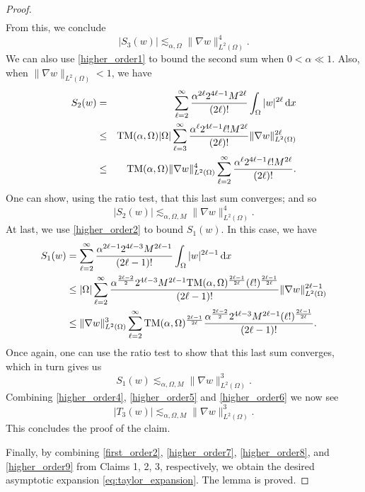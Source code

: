 \documentclass[reqno,11pt]{amsart}
\theoremstyle{definition}
\newcommand{\ud}{\,\mathrm{d}}
\begin{document}
\begin{proof}
\begin{align*}
    \end{align*} 
    From this, we conclude
    \begin{equation} \label{higher_order4}
    |S_3(w)| \lesssim_{\alpha,\Omega} \| \nabla w \|_{L^2(\Omega)}^4.
    \end{equation}
    We can also use \eqref{higher_order1} to bound the second sum when $0<\alpha\ll1$. Also, when $\| \nabla w \|_{L^2(\Omega)} < 1$, we have  
    \begin{eqnarray*} 
    S_2(w) & = & \sum_{\ell = 2}^\infty \frac{\alpha^{2\ell} 2^{4\ell-1}M^{2\ell} }{(2\ell)!} 
    \int_\Omega |w|^{2\ell} \ud x \\  
    & \leq & {\rm TM}(\alpha,\Omega) |\Omega| \sum_{\ell=3}^\infty \frac{\alpha^\ell 2^{4\ell-1} \ell! M^{2\ell}}
    {(2\ell)!} \| \nabla w\|_{L^2(\Omega)}^{2\ell} \\  
    & \leq & {\rm TM}(\alpha,\Omega) \| \nabla w\|_{L^2(\Omega)}^4 \sum_{\ell=2}^\infty 
    \frac{\alpha^\ell 2^{4\ell-1} \ell! M^{2\ell}}{(2\ell)!}. 
    \end{eqnarray*} 
    One can show, using the ratio test, that this last sum converges; and so
    \begin{equation} \label{higher_order5} 
    |S_2(w)| \lesssim_{\alpha,\Omega,M} \| \nabla w \|_{L^2(\Omega)}^4.
    \end{equation}
    At last, we use \eqref{higher_order2} to bound $S_1(w)$. 
    In this case, we have 
    \begin{align*} 
    S_1(w) & = \sum_{\ell=2}^\infty \frac{\alpha^{2\ell-1} 2^{4\ell-3} M^{2\ell-1} }
    {(2\ell-1) !} \int_\Omega |w|^{2\ell-1} \ud x \\ 
    & \leq |\Omega| \sum_{\ell=2}^\infty \frac{\alpha^{\frac{2\ell-2}{2}} 2^{4\ell-3} 
    M^{2\ell-1} {\rm TM}(\alpha,\Omega)^{\frac{2\ell-1}{2\ell}} (\ell!)^{\frac{2\ell-1}{2\ell}}}
    {(2\ell-1)!} \| \nabla w\|_{L^2(\Omega)}^{2\ell-1} \\ 
    & \leq  \| \nabla w \|_{L^2(\Omega)}^3 \sum_{\ell=2}^\infty 
    {\rm TM}(\alpha,\Omega)^{\frac{2\ell-1}{2\ell}}\frac{\alpha^{\frac{2\ell-2}{2}} 2^{4\ell-3} M^{2\ell-1} (\ell!)^{\frac{2\ell-1}{2\ell}}}{(2\ell-1)!}. 
    \end{align*} 
    Once again, one can use the ratio test to show that this last sum converges, which in 
    turn gives us 
    \begin{equation} \label{higher_order6} 
    S_1(w) \lesssim_{\alpha,\Omega,M} \| \nabla w \|_{L^2(\Omega)}^3. 
    \end{equation} 
    Combining \eqref{higher_order4}, \eqref{higher_order5} and \eqref{higher_order6}
    we now see 
    \begin{equation} \label{higher_order7} 
    |T_3(w)| \lesssim_{\alpha, \Omega, M} \| \nabla w \|_{L^2(\Omega)}^3.
    \end{equation} 
    This concludes the proof of the claim.
    
    Finally, by combining \eqref{first_order2}, \eqref{higher_order7}, \eqref{higher_order8}, 
    and \eqref{higher_order9} from Claims 1, 2, 3, respectively, we obtain 
    the desired asymptotic expansion \eqref{eq:taylor_expansion}. 
    The lemma is proved.
\end{proof}
\end{document}
